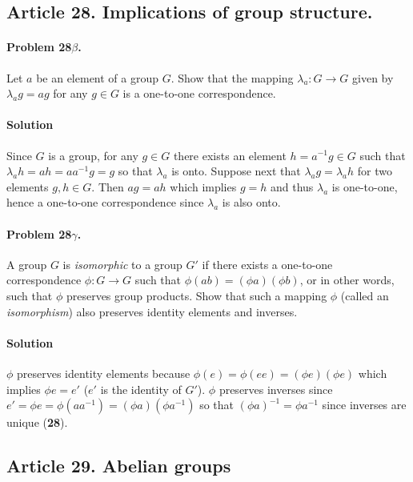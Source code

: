 \subsection{Article 28. Implications of group structure.}

\paragraph{Problem 28$\beta$.}
Let $a$ be an element of a group $G$. Show that the mapping $ \lambda_a : G \rightarrow G$
given by $ \lambda_a g = ag$ for any $g \in G$ is a one-to-one correspondence.

\paragraph*{Solution}
Since $G$ is a group, for any $g \in G$ there exists an element $h= a^{-1} g \in G$ such
that $ \lambda_a h = ah = aa^{-1}g = g$ so that $\lambda_a$ is onto. Suppose
next that $\lambda_a g = \lambda_a h$ for two elements $g, h \in G$. Then
$ ag = ah $ which implies $ g = h $ and thus $\lambda_a $ is one-to-one, hence
a one-to-one correspondence since $\lambda_a$ is also onto.

\paragraph{Problem 28$\gamma$.}
A group $G$ is \textit{isomorphic} to a group $G'$ if there exists a one-to-one
correspondence $\phi : G \rightarrow G$ such that $ \phi(ab) = (\phi a) (\phi b)$,
or in other words, such that $\phi$ preserves group products. Show that such a
mapping $\phi$ (called an \textit{isomorphism}) also preserves identity elements
and inverses.

\paragraph*{Solution}
$\phi$ preserves identity elements because $\phi(e) = \phi(ee) = (\phi e)(\phi e)$
which implies $ \phi e = e'$ ($e'$ is the identity of $G'$). $\phi$ preserves
inverses since $e' = \phi e = \phi (a a^{-1}) = (\phi a)(\phi a^{-1})$ so that
$(\phi a)^{-1} = \phi a^{-1}$ since inverses are unique (\textbf{28}).

\subsection{Article 29. Abelian groups}

